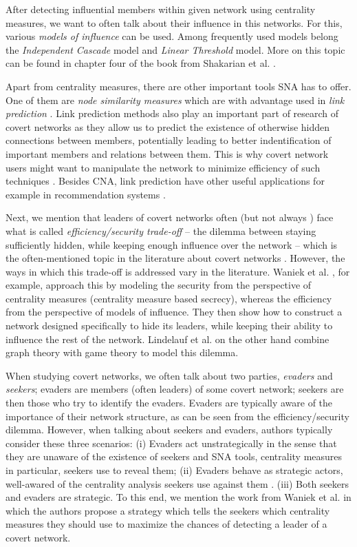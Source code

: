 After detecting influential members within given network using centrality measures,
we want to often talk about their influence in this networks.
For this, various \emph{models of influence} can be used.
Among frequently used models belong the \emph{Independent Cascade} model and \emph{Linear Threshold} model.
More on this topic can be found in chapter four of the book from Shakarian et al. \cite{Shakarian2015}.

Apart from centrality measures, there are other important tools SNA has to offer.
One of them are \emph{node similarity measures} which are with advantage used in \emph{link prediction} \cite{Zhou2009,Wang2014}.
Link prediction methods also play an important part of research of covert networks
as they allow us to predict the existence of otherwise hidden connections between members, potentially leading to
better indentification of important members and relations between them.
This is why covert network users might want to manipulate the network to minimize efficiency of such techniques \cite{Zhou2019}.
Besides CNA, link prediction have other useful applications for example in recommendation systems \cite{Huang2005,Talasu2017}.

Next, we mention that leaders of covert networks often (but not always \cite{Fatih2012}) face what is called
\emph{efficiency/security trade-off} \cite{Morselli2007} --
the dilemma between staying sufficiently hidden, while keeping enough influence over the network --
which is the often-mentioned topic in the literature about covert networks \cite{Crossley2012,Waniek2017,Lindelauf2009}.
However, the ways in which this trade-off is addressed vary in the literature.
Waniek et al. \cite{Waniek2017}, for example, approach this by modeling the security from the perspective of
centrality measures (centrality measure based secrecy), whereas the efficiency from the perspective of models of influence.
They then show how to construct a network designed specifically to hide its leaders, while
keeping their ability to influence the rest of the network.
Lindelauf et al. \cite{Lindelauf2009} on the other hand combine graph theory with game theory to model this dilemma.

When studying covert networks, we often talk about two parties, \emph{evaders} and \emph{seekers};
evaders are members (often leaders) of some covert network;
seekers are then those who try to identify the evaders.
Evaders are typically aware of the importance of their network structure, as can be seen from
the efficiency/security dilemma.
However, when talking about seekers and evaders, authors typically consider these three scenarios:
(i) Evaders act unstrategically in the sense that they are unaware of
the existence of seekers and SNA tools, centrality measures in particular, seekers use to reveal them;
(ii) Evaders behave as strategic actors, well-awared of the centrality analysis seekers use against them \cite{Waniek2017,Dey2019,Dey2020}.
(iii) Both seekers and evaders are strategic.
To this end, we mention the work from Waniek et al. \cite[y.~2021]{Waniek2021} in which the authors propose
a strategy which tells the seekers which centrality measures they should use to maximize the chances of detecting
a leader of a covert network.

